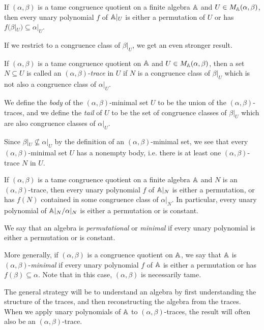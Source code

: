 \begin{appendices}
\begin{cor} If $(\alpha,\beta)$ is a tame congruence quotient on a finite algebra $\mathbb{A}$ and $U \in M_{\mathbb{A}}(\alpha,\beta)$, then every unary polynomial $f$ of $\mathbb{A}|_U$ is either a permutation of $U$ or has $f(\beta|_U) \subseteq \alpha|_U$.
\end{cor}

If we restrict to a congruence class of $\beta|_U$, we get an even stronger result.

\begin{defn} If $(\alpha,\beta)$ is a tame congruence quotient on $\mathbb{A}$ and $U \in M_{\mathbb{A}}(\alpha,\beta)$, then a set $N \subseteq U$ is called an $(\alpha,\beta)$-\emph{trace} in $U$ if $N$ is a congruence class of $\beta|_U$ which is not also a congruence class of $\alpha|_U$.

We define the \emph{body} of the $(\alpha,\beta)$-minimal set $U$ to be the union of the $(\alpha,\beta)$-traces, and we define the \emph{tail} of $U$ to be the set of congruence classes of $\beta|_U$ which are also congruence classes of $\alpha|_U$.
\end{defn}

Since $\beta|_U \not\subseteq \alpha|_U$ by the definition of an $(\alpha,\beta)$-minimal set, we see that every $(\alpha,\beta)$-minimal set $U$ has a nonempty body, i.e. there is at least one $(\alpha,\beta)$-trace $N$ in $U$.

\begin{cor}\label{cor-trace-permutational} If $(\alpha,\beta)$ is a tame congruence quotient on a finite algebra $\mathbb{A}$ and $N$ is an $(\alpha,\beta)$-trace, then every unary polynomial $f$ of $\mathbb{A}|_N$ is either a permutation, or has $f(N)$ contained in some congruence class of $\alpha|_N$. In particular, every unary polynomial of $\mathbb{A}|_N/\alpha|_N$ is either a permutation or is constant.
\end{cor}

\begin{defn} We say that an algebra is \emph{permutational} or \emph{minimal} if every unary polynomial is either a permutation or is constant.

More generally, if $(\alpha,\beta)$ is a congruence quotient on $\mathbb{A}$, we say that $\mathbb{A}$ is $(\alpha,\beta)$-\emph{minimal} if every unary polynomial $f$ of $\mathbb{A}$ is either a permutation or has $f(\beta) \subseteq \alpha$. Note that in this case, $(\alpha,\beta)$ is necessarily tame.
\end{defn}

The general strategy will be to understand an algebra by first understanding the structure of the traces, and then reconstructing the algebra from the traces. When we apply unary polynomials of $\mathbb{A}$ to $(\alpha,\beta)$-traces, the result will often also be an $(\alpha,\beta)$-trace.


\end{appendices}
